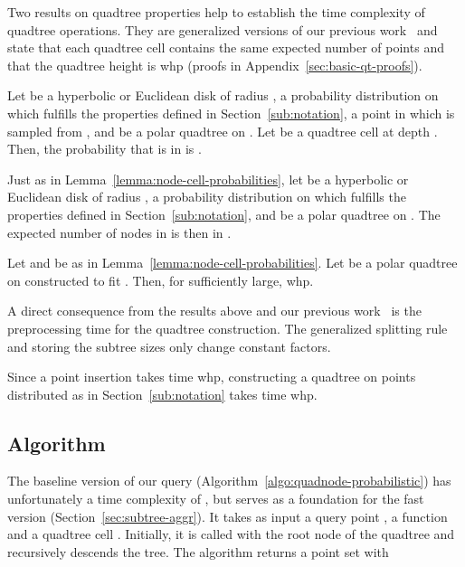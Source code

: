 \documentclass{llncs}
\begin{document}
Two results on quadtree properties help to establish the time complexity of quadtree operations.
They are generalized versions of our previous work~\cite[Lemmas~1 and~2]{Looz2015HRG} and state that each quadtree cell contains the same expected number of points and that the quadtree height is  whp (proofs in Appendix~\ref{sec:basic-qt-proofs}).

\begin{lemma}
Let  be a hyperbolic or Euclidean disk of radius ,  a probability distribution on  which fulfills the properties defined in Section~\ref{sub:notation},  a point in  which is sampled from , and  be a polar quadtree on .
Let  be a quadtree cell at depth . Then, the probability that  is in  is .
\label{lemma:node-cell-probabilities}
\end{lemma}
\begin{lemma}
Just as in Lemma~\ref{lemma:node-cell-probabilities}, 
let  be a hyperbolic or Euclidean disk of radius ,  a probability distribution on  which fulfills the properties defined in Section~\ref{sub:notation}, and  be a polar quadtree on .
The expected number of  nodes in  is then in .
\label{lemma:bound-number-quadtree-cells}
\end{lemma}
\begin{proposition}
 \label{thm:quadtree-height}
Let  and  be as in Lemma~\ref{lemma:node-cell-probabilities}.
Let  be a polar quadtree on  constructed to fit .
Then, for  sufficiently large,  whp.
\end{proposition}

A direct consequence from the results above and our previous work~\cite{Looz2015HRG} is the preprocessing
time for the quadtree construction. The generalized splitting rule and storing the subtree sizes only change constant factors.

\begin{corollary}
\label{cor:qt-construction}
Since a point insertion takes  time whp, constructing a quadtree on  points distributed as 
in Section~\ref{sub:notation} takes  time whp.
\end{corollary}

\subsection{Algorithm}
\label{sub:baseline-algo}
The baseline version of our query (Algorithm~\ref{algo:quadnode-probabilistic}) has unfortunately a time complexity of , but serves as a foundation for the fast version (Section~\ref{sec:subtree-aggr}).
It takes as input a query point , a function  and a quadtree cell .
Initially, it is called with the root node of the quadtree and recursively descends the tree.
The algorithm returns a point set  with
\end{document}
